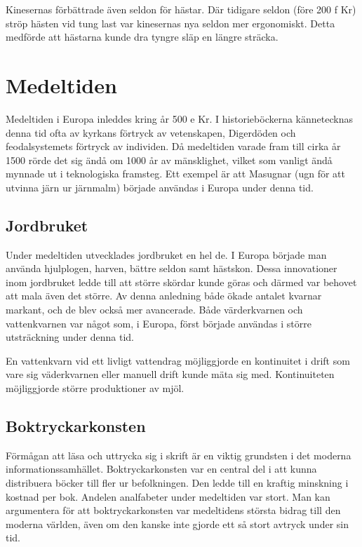 \documentclass[a4paper,12pt,fleqn]{article}
\begin{document}
Kinesernas förbättrade även seldon för hästar. Där tidigare seldon (före 200 f Kr) ströp hästen vid tung last var kinesernas nya seldon mer ergonomiskt. Detta medförde att hästarna kunde dra tyngre släp en längre sträcka. 

\newpage
\section{Medeltiden}

Medeltiden i Europa inleddes kring år 500 e Kr. I historieböckerna kännetecknas denna tid ofta av kyrkans förtryck av vetenskapen, Digerdöden och feodalsystemets förtryck av individen. Då medeltiden varade fram till cirka år 1500 rörde det sig ändå om 1000 år av mänsklighet, vilket som vanligt ändå mynnade ut i teknologiska framsteg. Ett exempel är att Masugnar (ugn för att utvinna järn ur järnmalm) började användas i Europa under denna tid.

\subsection{Jordbruket}

Under medeltiden utvecklades jordbruket en hel de. I Europa började man använda hjulplogen, harven, bättre seldon samt hästskon. Dessa innovationer inom jordbruket ledde till att större skördar kunde göras och därmed var behovet att mala även det större. Av denna anledning både ökade antalet kvarnar markant, och de blev också mer avancerade. Både värderkvarnen och vattenkvarnen var något som, i Europa, först började användas i större utsträckning under denna tid. 

En vattenkvarn vid ett livligt vattendrag möjliggjorde en kontinuitet i drift som vare sig väderkvarnen eller manuell drift kunde mäta sig med. Kontinuiteten möjliggjorde större produktioner av mjöl. 

\subsection{Boktryckarkonsten}

Förmågan att läsa och uttrycka sig i skrift är en viktig grundsten i det moderna informationssamhället. Boktryckarkonsten var en central del i att kunna distribuera böcker till fler ur befolkningen. Den ledde till en kraftig minskning i kostnad per bok. Andelen analfabeter under medeltiden var stort. Man kan argumentera för att boktryckarkonsten var medeltidens största bidrag till den moderna världen, även om den kanske inte gjorde ett så stort avtryck under sin tid. 
\end{document}
